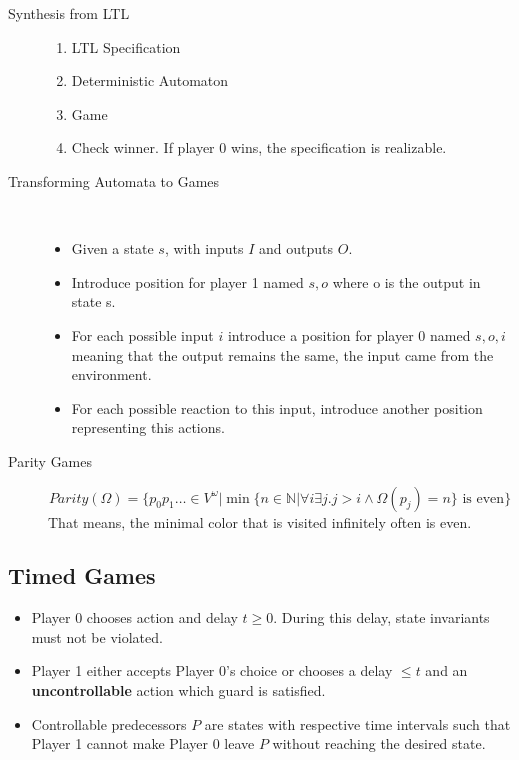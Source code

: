 \begin{description}
	\item[Synthesis from LTL] 
	\begin{enumerate}
		\item LTL Specification
		\item Deterministic Automaton
		\item Game
		\item Check winner. If player 0 wins, the specification is realizable.
	\end{enumerate}
	\item[Transforming Automata to Games] \ 
	\begin{itemize}
		\item Given a state $s$, with inputs $I$ and outputs $O$. 
		\item Introduce position for player 1 named $s, o$ where o is the output in state s. 
		\item For each possible input $i$ introduce a position for player 0 named $s, o, i$ meaning that the output remains the same, the input came from the environment. 
		\item For each possible reaction to this input, introduce another position representing this actions.
	\end{itemize}
	\item[Parity Games] 
	\[ \textit{Parity}(\Omega) = \{ p_0p_1\ldots \in V^\omega | \min\{ n \in \mathds{N} | \forall i \exists j. j>i \land \Omega(p_j) = n \} \text{ is even} \} \] 
	That means, the minimal color that is visited infinitely often is even.
\end{description}

\subsection{Timed Games}

\begin{itemize}
	\item Player 0 chooses action and delay $t \geq 0$. During this delay, state invariants must not be violated.
	\item Player 1 either accepts Player 0's choice or chooses a delay $\leq t$ and an \textbf{uncontrollable} action which guard is satisfied.
	\item Controllable predecessors $P$ are states with respective time intervals such that Player 1 cannot make Player 0 leave $P$ without reaching the desired state.
\end{itemize}


